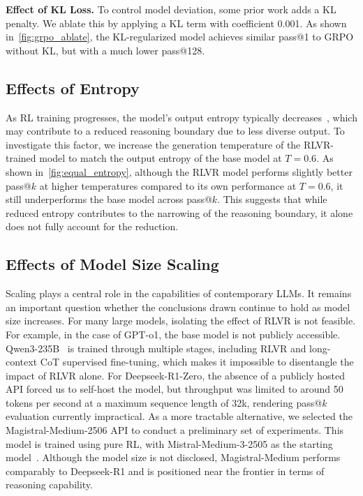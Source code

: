 \textbf{Effect of KL Loss.} 
To control model deviation, some prior work adds a KL penalty. We ablate this by applying a KL term with coefficient 0.001. As shown in~\cref{fig:grpo_ablate}, the KL-regularized model achieves similar pass@1 to GRPO without KL, but with a much lower pass@128.

\vspace{-0.5mm}
\subsection{Effects of Entropy}
\vspace{-0.5mm}

As RL training progresses, the model's output entropy typically decreases~\cite{yu2025dapo}, which may contribute to a reduced reasoning boundary due to less diverse output. 
To investigate this factor, we increase the generation temperature of the RLVR-trained model to match the output entropy of the base model at $T = 0.6$. 
As shown in~\cref{fig:equal_entropy}, although the RLVR model performs slightly better pass@$k$ at higher temperatures compared to its own performance at $T = 0.6$, it still underperforms the base model across pass@$k$.
This suggests that while reduced entropy contributes to the narrowing of the reasoning boundary, it alone does not fully account for the reduction.


\vspace{-0.5mm}
\subsection{Effects of Model Size Scaling}
\vspace{-0.5mm}

Scaling plays a central role in the capabilities of contemporary LLMs. It remains an important question whether the conclusions drawn continue to hold as model size increases. 
For many large models, isolating the effect of RLVR is not feasible. For example, in the case of GPT-o1, the base model is not publicly accessible. Qwen3-235B~\cite{yang2025qwen3} is trained through multiple stages, including RLVR and long-context CoT supervised fine-tuning, which makes it impossible to disentangle the impact of RLVR alone. For Deepseek-R1-Zero, the absence of a publicly hosted API forced us to self-host the model, but throughput was limited to around 50 tokens per second at a maximum sequence length of 32k, rendering pass@$k$ evaluation currently impractical.
As a more tractable alternative, we selected the Magistral-Medium-2506 API to conduct a preliminary set of experiments.
This model is trained using pure RL, with Mistral-Medium-3-2505 as the starting model~\cite{rastogi2025magistral}. Although the model size is not disclosed, Magistral-Medium performs comparably to Deepseek-R1 and is positioned near the frontier in terms of reasoning capability.


